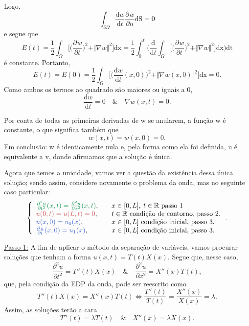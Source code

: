 \documentclass[../pde_notes.tex]{subfiles}
\begin{document}
Logo,
\[
	\int_{\partial \Omega }^{}\frac{\mathrm{d}w}{\mathrm{d}t} \frac{\partial^{}w}{\partial n^{}} \mathrm{dS} = 0
\]
e segue que
\[
	E(t)=\frac{1}{2}\int_{\Omega }^{}\biggl[\biggl(\frac{\partial^{}w}{\partial t^{}}\biggr)^{2}+\Vert \nabla w \Vert^{2}\biggr] \mathrm{dx} = \frac{1}{2}\int_{0}^{t} \biggl(\frac{\mathrm{d}}{\mathrm{d}t} \int_{\Omega }^{}\biggl[\biggl(\frac{\partial^{}w}{\partial t^{}}\biggr)^{2}+\Vert \nabla w \Vert^{2}\biggr] \mathrm{dx}\biggr)\mathrm{dt}
\]
é constante. Portanto,
\[
	E(t)=E(0)=\frac{1}{2}\int_{\Omega }^{}\biggl[\biggl(\frac{\mathrm{d}w}{\mathrm{d}t}(x, 0)\biggr)^{2} + \Vert \nabla w(x,0) \Vert^{2}\biggr] \mathrm{dx} = 0.
\]
Como ambos os termos ao quadrado são maiores ou iguais a 0,
\[
	\frac{\mathrm{d}w}{\mathrm{d}t} = 0 \quad\&\quad \nabla w(x, t)=0.
\]

Por conta de todas as primeiras derivadas de w se anularem, a função w é constante, o que significa também que
\[
	w(x, t)=w(x, 0)=0.
\]
Em conclusão: w é identicamente nula e, pela forma como ela foi definida, u é equivalente a v, donde afirmamos que a solução é única.

Agora que temos a unicidade, vamos ver a questão da existência dessa única solução; sendo assim, considere novamente o problema da onda, mas no seguinte caso particular:
\[
	\left\{\begin{array}{ll}
		{\color{SpringGreen4}\frac{\partial^{2}u}{\partial t^{2}}(x, t)=\frac{\partial^{2}u}{\partial x^{2}}(x, t)}, & \quad x\in [0, L],\: t\in \mathbb{R} \text{ passo 1}         \\
		{\color{IndianRed3}u(0, t) = u(L, t)=0},                                                                     & \quad t\in \mathbb{R} \text{ condição de contorno, passo 2.} \\
		{\color{RoyalBlue3}u(x,0)=u_{0}(x)},                                                                         & \quad  x\in [0, L]     \text{ condição inicial, passo 3.}    \\
		{\color{RoyalBlue3}\frac{\partial^{}u}{\partial t^{}}(x,0)=u_{1}(x)},                                        & \quad  x\in [0, L]\text{ condição inicial, passo 3.}
	\end{array}\right..
\]

{\color{SpringGreen4}\underline{Passo 1:}} A fim de aplicar o método da separação de variáveis, vamos procurar soluções que tenham a forma \(u(x, t)=T(t)X(x).\) Segue que, nesse caso,
\[
	\frac{\partial^{2}u}{\partial t^{2}} = T''(t)X(x) \quad\&\quad \frac{\partial^{2}u}{\partial x^{2}} = X''(x)T(t),
\]
que, pela condição da EDP da onda, pode ser reescrito como
\[
	T''(t)X(x) = X''(x) T(t) \Longleftrightarrow \frac{T''(t)}{T(t)} = \frac{X''(x)}{X(x)} = \lambda.
\]
Assim, as soluções terão a cara
\[
	T''(t) = \lambda T(t) \quad\&\quad X''(x) = \lambda X(x).
\]
\end{document}
